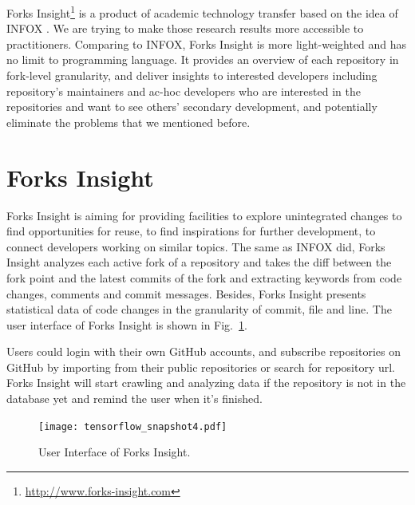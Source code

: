 Forks Insight\footnote{\url{http://www.forks-insight.com}} is a product of academic technology transfer based on the idea of INFOX \cite{ZSLXWK:ICSE18}. We are trying to make those research results more accessible to practitioners. Comparing to INFOX, Forks Insight is more light-weighted and has no limit to programming language. It provides an overview of each repository in fork-level granularity, and deliver insights to interested developers including repository's maintainers and ac-hoc developers who are interested in the repositories and want to see others' secondary development, and potentially eliminate the problems that we mentioned before.


\section{Forks Insight}

Forks Insight is aiming for providing facilities to explore unintegrated changes to find opportunities for reuse, to find inspirations for further development, to connect developers working on similar topics.
%
The same as INFOX did, Forks Insight analyzes each active fork of a repository and takes the diff between the fork point and the latest commits   of the fork and extracting keywords from code changes, comments and commit messages.
%
Besides, Forks Insight presents statistical data of code changes in the granularity of commit, file and line. The user interface of Forks Insight is shown in Fig.~\ref{GUI}. 

Users could login with their own GitHub accounts, and subscribe repositories on GitHub by importing from their public repositories or search for repository url. Forks Insight will start crawling and analyzing data if the repository is not in the database yet and remind the user when it's finished.

\begin{figure}[t]
\texttt{[image: tensorflow\_snapshot4.pdf]}
\caption{User Interface of Forks Insight.}
	\vspace{-15pt}
	 \label{GUI}
\end{figure}

